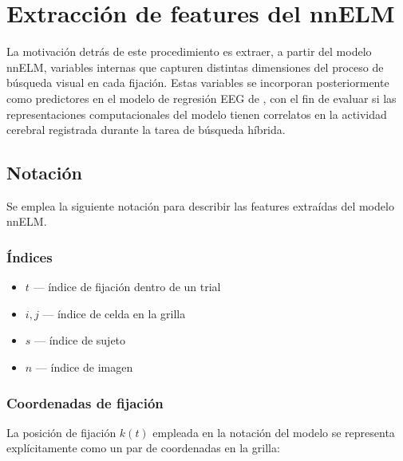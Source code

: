\section{Extracción de features del nnELM}
\label{sec:extraccion_features}


La motivación detrás de este procedimiento es extraer, a partir del modelo nnELM,
variables internas que capturen distintas dimensiones del proceso de
búsqueda visual en cada fijación. Estas variables se incorporan
posteriormente como predictores en el modelo de regresión EEG de
\citet{care2025}, con el fin de evaluar si las representaciones
computacionales del modelo tienen correlatos en la actividad cerebral
registrada durante la tarea de búsqueda híbrida.

\subsection{Notación}

Se emplea la siguiente notación para describir
las features extraídas del modelo nnELM.

\subsubsection*{Índices}
\begin{itemize}
    \item $t$ — índice de fijación dentro de un trial
    \item $i, j$ — índice de celda en la grilla
    \item $s$ — índice de sujeto
    \item $n$ — índice de imagen
\end{itemize}

\subsubsection*{Coordenadas de fijación}

La posición de fijación $k(t)$ empleada en la notación del modelo
se representa explícitamente como un par de coordenadas en la grilla:

